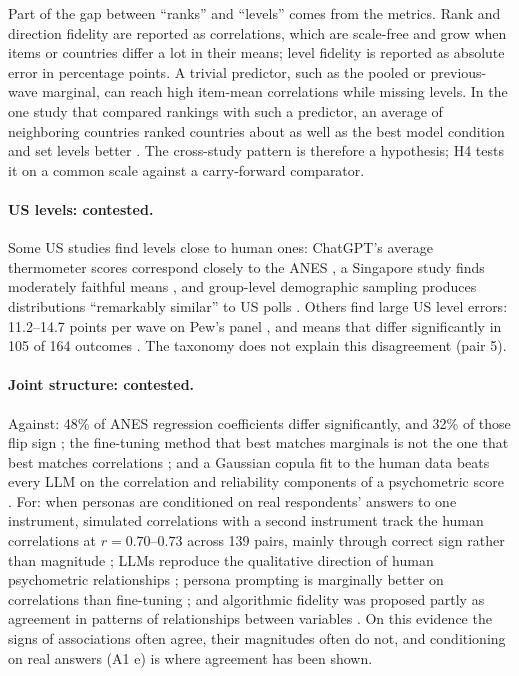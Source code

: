 \documentclass[11pt]{article}
\begin{document}
Part of the gap between ``ranks'' and ``levels'' comes from the metrics. Rank and direction fidelity are reported as correlations, which are scale-free and grow when items or countries differ a lot in their means; level fidelity is reported as absolute error in percentage points. A trivial predictor, such as the pooled or previous-wave marginal, can reach high item-mean correlations while missing levels. In the one study that compared rankings with such a predictor, an average of neighboring countries ranked countries about as well as the best model condition and set levels better \citep{wang2026ess}. The cross-study pattern is therefore a hypothesis; H4 tests it on a common scale against a carry-forward comparator.

\paragraph{US levels: contested.} Some US studies find levels close to human ones: ChatGPT's average thermometer scores correspond closely to the ANES \citep{bisbee2024}, a Singapore study finds moderately faithful means \citep{lam2026fast}, and group-level demographic sampling produces distributions ``remarkably similar'' to US polls \citep{sun2024random}. Others find large US level errors: 11.2--14.7 points per wave on Pew's panel \citep{pew2026}, and means that differ significantly in 105 of 164 outcomes \citep{peng2025funhouse}. The taxonomy does not explain this disagreement (pair 5).

\paragraph{Joint structure: contested.} Against: 48\% of ANES regression coefficients differ significantly, and 32\% of those flip sign \citep{bisbee2024}; the fine-tuning method that best matches marginals is not the one that best matches correlations \citep{williams2026beyond}; and a Gaussian copula fit to the human data beats every LLM on the correlation and reliability components of a psychometric score \citep{lukauskas2026}. For: when personas are conditioned on real respondents' answers to one instrument, simulated correlations with a second instrument track the human correlations at $r = 0.70$--$0.73$ across 139 pairs, mainly through correct sign rather than magnitude \citep{lee2026openweight}; LLMs reproduce the qualitative direction of human psychometric relationships \citep{lukauskas2026}; persona prompting is marginally better on correlations than fine-tuning \citep{williams2026beyond}; and algorithmic fidelity was proposed partly as agreement in patterns of relationships between variables \citep{argyle2023}. On this evidence the signs of associations often agree, their magnitudes often do not, and conditioning on real answers (A1 e) is where agreement has been shown.
\end{document}
